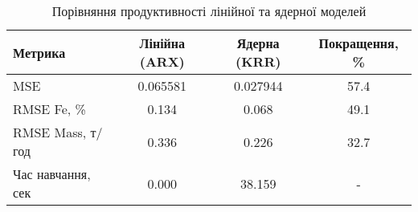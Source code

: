 
    \begin{table}[h]
    \centering
    \caption{Порівняння продуктивності лінійної та ядерної моделей}
    \label{tab:model_comparison}
    \begin{tabular}{|l|c|c|c|}
    \hline
    \textbf{Метрика} & \textbf{Лінійна (ARX)} & \textbf{Ядерна (KRR)} & \textbf{Покращення, \%} \\
    \hline
    MSE & 0.065581 & 0.027944 & 57.4 \\
    \hline
    RMSE Fe, \% & 0.134 & 0.068 & 49.1 \\
    \hline
    RMSE Mass, т/год & 0.336 & 0.226 & 32.7 \\
    \hline
    Час навчання, сек & 0.000 & 38.159 & - \\
    \hline
    \end{tabular}
    \end{table}
    